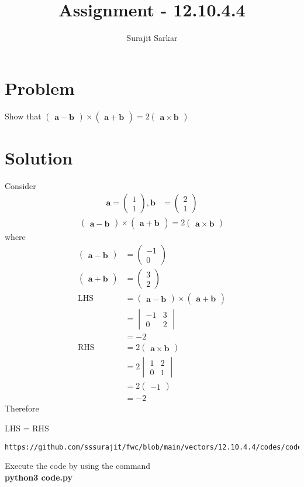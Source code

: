 \documentclass[journal,12pt,twocolumn]{IEEEtran}
\title{\mytitle}
\title{
Assignment - 12.10.4.4
}
\author{Surajit Sarkar}
\newcommand{\myvec}[1]{\ensuremath{\begin{pmatrix}#1\end{pmatrix}}}
\newcommand{\mydet}[1]{\ensuremath{\begin{vmatrix}#1\end{vmatrix}}}
\let\vec\mathbf
\begin{document}
\maketitle
\tableofcontents
\bigskip
\section{\textbf{Problem}}
Show that $\myvec{\vec{a}-\vec{b}}\times\myvec{\vec{a}+\vec{b}}=2\myvec{\vec{a}\times\vec{b}}$
\section{\textbf{Solution}}
Consider
\begin{align}
\vec{a}=\myvec{1\\1},\vec{b}&=\myvec{2\\1}
\end{align}
\begin{align}
  \myvec{\vec{a}-\vec{b}}\times\myvec{\vec{a}+\vec{b}}=2\myvec{\vec{a}\times\vec{b}}
  \end{align}
  where
  \begin{align}
  \myvec{\vec{a}-\vec{b}}&=\myvec{-1\\0}\\
  \myvec{\vec{a}+\vec{b}}&=\myvec{3\\2}\\
  \text{LHS} &= \myvec{\vec{a}-\vec{b}}\times\myvec{\vec{a}+\vec{b}}\\
  &=\mydet{-1 & 3\\0 & 2} \\
  &=-2\\
  \text{RHS}&=2\myvec{\vec{a}\times\vec{b}}\\
  &=2\mydet{1 & 2\\0 & 1}\\
  &=2\myvec{-1}\\
  &=-2
  \end{align}
  Therefore
  \begin{center}
  LHS = RHS
  \end{center}
\begin{lstlisting}
https://github.com/sssurajit/fwc/blob/main/vectors/12.10.4.4/codes/code.py
\end{lstlisting}
Execute the code by using the command\\
\textbf{python3 code.py}
\end{document}
